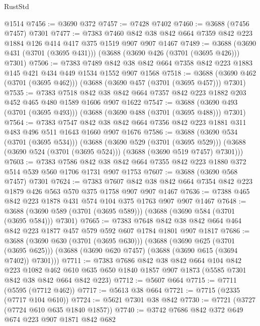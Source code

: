 \begin{lexlean}{RustStd}
\begin{coremodule}
    @1514
@7456 := @3690 @372
@7457 := @7428 @7402
@7460 := @3688 (@7456 @7457) @7301
@7477 := @7383
    @7460
    @842
    @38
    @842
    @664
    @7359
    @842
    @223
    @1884
    @126
    @414
    @417
    @375
    @1519
    @907
    @907
    @1467
@7489 := @3688 (@3690 @431 (@3701 (@3695 @431))) (@3688 (@3690 @426 (@3701 (@3695 @426))) @7301)
@7506 := @7383
    @7489
    @842
    @38
    @842
    @664
    @7358
    @842
    @223
    @1883
    @145
    @421
    @434
    @449
    @1534
    @1552
    @907
    @1568
@7518 := @3688 (@3690 @462 (@3701 (@3695 @462))) (@3688 (@3690 @457 (@3701 (@3695 @457))) @7301)
@7535 := @7383
    @7518
    @842
    @38
    @842
    @664
    @7357
    @842
    @223
    @1882
    @203
    @452
    @465
    @480
    @1589
    @1606
    @907
    @1622
@7547 := @3688 (@3690 @493 (@3701 (@3695 @493))) (@3688 (@3690 @488 (@3701 (@3695 @488))) @7301)
@7564 := @7383
    @7547
    @842
    @38
    @842
    @664
    @7356
    @842
    @223
    @1881
    @311
    @483
    @496
    @511
    @1643
    @1660
    @907
    @1676
@7586 := @3688
    (@3690 @534 (@3701 (@3695 @534)))
    (@3688
      (@3690 @529 (@3701 (@3695 @529)))
      (@3688 (@3690 @524 (@3701 (@3695 @524))) (@3688 (@3690 @519 @7457) @7301)))
@7603 := @7383
    @7586
    @842
    @38
    @842
    @664
    @7355
    @842
    @223
    @1880
    @372
    @514
    @539
    @560
    @1706
    @1731
    @907
    @1753
@7607 := @3688 (@3690 @568 @7457) @7301
@7624 := @7383
    @7607
    @842
    @38
    @842
    @664
    @7354
    @842
    @223
    @1879
    @426
    @563
    @570
    @375
    @1758
    @907
    @907
    @1467
@7636 := @7388 @465 @842 @223 @1878 @431 @574 @104 @375 @1763 @907 @907 @1467
@7648 := @3688 (@3690 @589 (@3701 (@3695 @589))) (@3688 (@3690 @584 (@3701 (@3695 @584))) @7301)
@7665 := @7383
    @7648
    @842
    @38
    @842
    @664
    @464
    @842
    @223
    @1877
    @457
    @579
    @592
    @607
    @1784
    @1801
    @907
    @1817
@7686 := @3688
    (@3690 @630 (@3701 (@3695 @630)))
    (@3688
      (@3690 @625 (@3701 (@3695 @625)))
      (@3688 (@3690 @620 @7457) (@3688 (@3690 @615 (@3694 @7402)) @7301)))
@7711 := @7383
    @7686
    @842
    @38
    @842
    @664
    @104
    @842
    @223
    @1082
    @462
    @610
    @635
    @650
    @1840
    @1857
    @907
    @1873
    (@5585 @7301 @842 @38 @842 @664 @842 @223)
@7712 := @5607 @664
@7715 := @7711 (@5595 (@7712 @462))
@7717 := @5613 @38 @664
@7721 := @7715 (@2335 (@7717 @104 @610))
@7724 := @5621 @7301 @38 @842
@7730 := @7721 (@3727 (@7724 @610 @635 @1840 @1857))
@7740 := @3742 @7686 @842 @372 @649 @674 @223 @907 @1871 @842 @682

\end{coremodule}
\end{lexlean}
